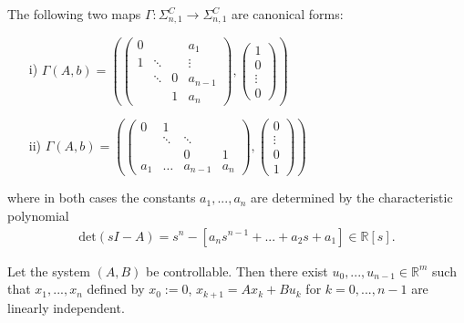\begin{mythm}\label{thm:4.2}
    The following two maps $\Gamma:\Sigma_{n,1}^C\rightarrow\Sigma_{n,1}^C$ are canonical forms:
    \begin{itemize}
        \item[i)] $\Gamma(A,b) = \left(\begin{pmatrix}
                    0 &  &  & a_1 \\ 
                    1 & \ddots &  & \vdots \\ 
                    & \ddots & 0 & a_{n-1} \\ 
                    &  & 1 & a_n
                    \end{pmatrix},
                    \begin{pmatrix}
                        1 \\ 
                        0 \\ 
                        \vdots \\ 
                        0
                    \end{pmatrix} \right)$
    \item[ii)] $\Gamma(A,b) = \left(\begin{pmatrix}
		0 & 1 &  &  \\
		& \ddots & \ddots &  \\
		&  & 0 & 1 \\
		a_1 & \dots & a_{n-1} & a_n
		\end{pmatrix},
		\begin{pmatrix}
            0 \\ 
            \vdots \\ 
            0 \\ 
            1
            \end{pmatrix} \right)$
    \end{itemize}
    where in both cases the constants $a_1,...,a_n$ are determined by the characteristic polynomial
    \begin{align*}
        \text{det}(sI-A)=s^n-[a_ns^{n-1}+...+a_2s+a_1] \in \mathbb{R}[s].
    \end{align*}
\end{mythm}
\begin{mylem}\label{lem:9.3}
	Let the system $(A,B)$ be controllable. Then there exist $u_0,...,u_{n-1} \in \mathbb{R}^m$ such that $x_1,...,x_n$ defined by $x_0:=0$, $x_{k+1}=Ax_k+Bu_k$ for $k=0,...,n-1$ are linearly independent.
\end{mylem}
